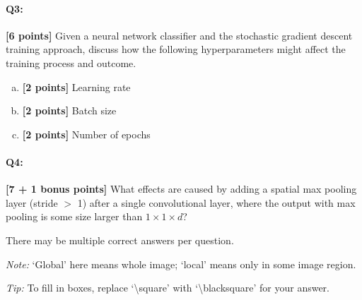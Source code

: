 
\pagebreak
\paragraph{Q3:} \textbf{[6 points]} Given a neural network classifier and the stochastic gradient descent training approach, discuss how the following hyperparameters might affect the training process and outcome.

\begin{enumerate}[(a)]
    \item \textbf{[2 points]} Learning rate
    \item \textbf{[2 points]} Batch size
    \item \textbf{[2 points]} Number of epochs
\end{enumerate}









\pagebreak
\paragraph{Q4:} \textbf{[7 + 1 bonus points]} What effects are caused by adding a spatial max pooling layer (stride $>$ 1) after a single convolutional layer, where the output with max pooling is some size larger than $1 \times 1 \times d$?

There may be multiple correct answers per question.

\emph{Note:} `Global' here means whole image; `local' means only in some image region.

\emph{Tip:} To fill in boxes, replace `\textbackslash square' with `\textbackslash blacksquare' for your answer.


